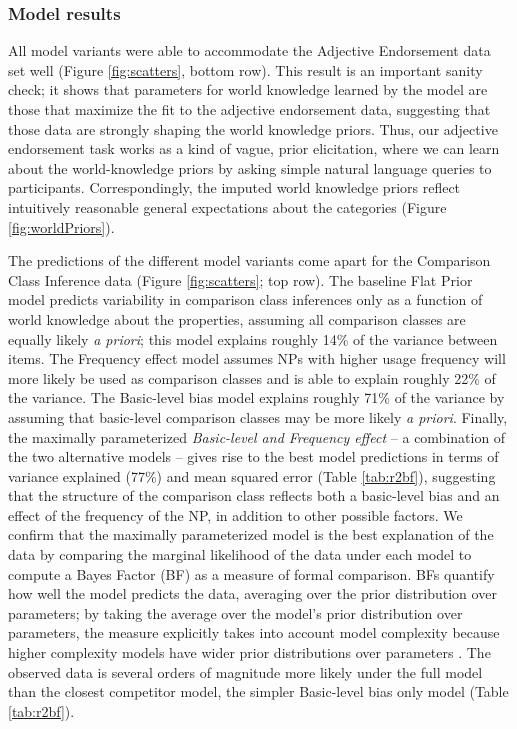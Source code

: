 \documentclass[doc, floatsintext]{apa6}
\begin{document}
\subsubsection{Model results}%
All model variants were able to accommodate the Adjective Endorsement data set well (Figure \ref{fig:scatters}, bottom row).
This result is an important sanity check; it shows that parameters for world knowledge learned by the model are those that maximize the fit to the adjective endorsement data, suggesting that those data are strongly shaping the world knowledge priors.
 Thus, our adjective endorsement task works as a kind of vague, prior elicitation, where we can learn about the world-knowledge priors by asking simple natural language queries to participants. 
Correspondingly, the imputed world knowledge priors reflect intuitively reasonable general expectations about the categories (Figure \ref{fig:worldPriors}).

The predictions of the different model variants come apart for the Comparison Class Inference data (Figure \ref{fig:scatters}; top row).
The baseline Flat Prior model predicts variability in comparison class inferences only as a function of world knowledge about the properties, assuming all comparison classes are equally likely \emph{a priori}; this model explains roughly 14\% of the variance between items.
The Frequency effect model assumes NPs with higher usage frequency will more likely be used as comparison classes and is able to explain roughly 22\% of the variance.
The Basic-level bias model explains roughly 71\% of the variance by assuming that basic-level comparison classes may be more likely \emph{a priori}.
Finally, the maximally parameterized \emph{Basic-level and Frequency effect} -- a combination of the two alternative models -- gives rise to the best model predictions in terms of variance explained (77\%) and mean squared error (Table \ref{tab:r2bf}), suggesting that the structure of the comparison class reflects both a basic-level bias and an effect of the frequency of the NP, in addition to other possible factors.
We confirm that the maximally parameterized model is the best explanation of the data by comparing the marginal likelihood of the data under each model to compute a Bayes Factor (BF) as a measure of formal comparison. 
BFs quantify how well the model predicts the data, averaging over the prior distribution over parameters; by taking the average over the model's prior distribution over parameters, the measure explicitly takes into account model complexity because higher complexity models have wider prior distributions over parameters \cite{lee2014bayesian}.
The observed data is several orders of magnitude more likely under the full model than the closest competitor model, the simpler Basic-level bias only model (Table \ref{tab:r2bf}).
\end{document}
